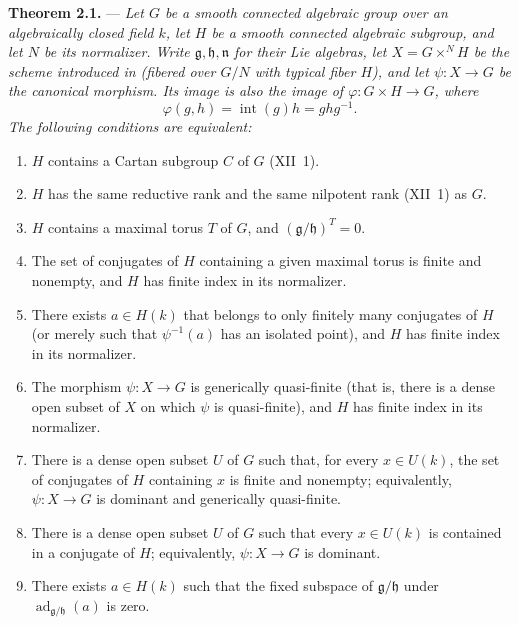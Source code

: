 \medskip
\noindent{}\textbf{Theorem 2.1.} ---
\textit{Let \(G\) be a smooth connected algebraic group over an
algebraically closed field \(k\), let \(H\) be a smooth connected
algebraic subgroup, and let \(N\) be its normalizer. Write
\(\mathfrak g,\mathfrak h,\mathfrak n\) for their Lie algebras, let
\(X=G\times^N H\) be the scheme introduced in  (fibered over
\(G/N\) with typical fiber \(H\)), and let \(\psi:X\to G\) be the
canonical morphism. Its image is also the image of
\(\varphi:G\times H\to G\), where}
\[
  \varphi(g,h)=\operatorname{int}(g)h=ghg^{-1}.
\]
\textit{The following conditions are equivalent:}

\begin{enumerate}
\item[(i)] 
  \(H\) contains a Cartan subgroup \(C\) of \(G\) (XII~1).
\item[(i bis)] 
  \(H\) has the same reductive rank and the same nilpotent rank
  (XII~1) as \(G\).
\item[(ii)] 
  \(H\) contains a maximal torus \(T\) of \(G\), and
  \((\mathfrak g/\mathfrak h)^T=0\).
\item[(iii)] 
  The set of conjugates of \(H\) containing a given maximal torus is
  finite and nonempty, and \(H\) has finite index in its normalizer.
\item[(iv)] 
  There exists \(a\in H(k)\) that belongs to only finitely many
  conjugates of \(H\) (or merely such that \(\psi^{-1}(a)\) has an
  isolated point), and \(H\) has finite index in its normalizer.
\item[(iv bis)] 
  The morphism \(\psi:X\to G\) is generically quasi-finite (that is,
  there is a dense open subset of \(X\) on which \(\psi\) is
  quasi-finite), and \(H\) has finite index in its normalizer.
\item[(v)] 
  There is a dense open subset \(U\) of \(G\) such that, for every
  \(x\in U(k)\), the set of conjugates of \(H\) containing \(x\) is
  finite and nonempty; equivalently, \(\psi:X\to G\) is dominant and
  generically quasi-finite.
\item[(vi)] 
  There is a dense open subset \(U\) of \(G\) such that every
  \(x\in U(k)\) is contained in a conjugate of \(H\); equivalently,
  \(\psi:X\to G\) is dominant.
\item[(vii)] 
  There exists \(a\in H(k)\) such that the fixed subspace of
  \(\mathfrak g/\mathfrak h\) under
  \(\operatorname{ad}_{\mathfrak g/\mathfrak h}(a)\) is zero.
\end{enumerate}

